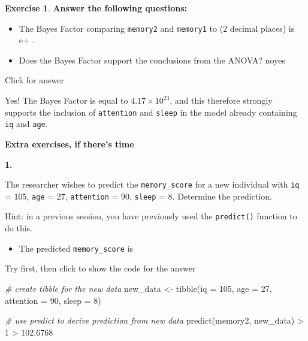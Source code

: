 \documentclass[
]{book}
\newenvironment{Shaded}{\begin{snugshade}}{\end{snugshade}}
\newcommand{\AttributeTok}[1]{\textcolor[rgb]{0.77,0.63,0.00}{#1}}
\newcommand{\CommentTok}[1]{\textcolor[rgb]{0.56,0.35,0.01}{\textit{#1}}}
\newcommand{\DecValTok}[1]{\textcolor[rgb]{0.00,0.00,0.81}{#1}}
\newcommand{\FloatTok}[1]{\textcolor[rgb]{0.00,0.00,0.81}{#1}}
\newcommand{\FunctionTok}[1]{\textcolor[rgb]{0.00,0.00,0.00}{#1}}
\newcommand{\NormalTok}[1]{#1}
\newcommand{\OtherTok}[1]{\textcolor[rgb]{0.56,0.35,0.01}{#1}}
\newcommand{\SpecialCharTok}[1]{\textcolor[rgb]{0.00,0.00,0.00}{#1}}
\providecommand{\tightlist}{%
  \setlength{\itemsep}{0pt}\setlength{\parskip}{0pt}}
\theoremstyle{definition}
\theoremstyle{definition}
\theoremstyle{definition}
\newtheorem{exercise}{Exercise}[chapter]
\theoremstyle{definition}
\theoremstyle{remark}
\begin{document}
\begin{exercise}
\hfill\break

\textbf{Answer the following questions:}

\begin{itemize}
\item
  The Bayes Factor comparing \texttt{memory2} and \texttt{memory1} to (2 decimal places) is e+ .
\item
  Does the Bayes Factor support the conclusions from the ANOVA? noyes
\end{itemize}

Click for answer

Yes! The Bayes Factor is equal to \(4.17 \times 10^{23}\), and this therefore strongly supports the inclusion of \texttt{attention} and \texttt{sleep} in the model already containing \texttt{iq} and \texttt{age}.

\hfill\break

\hfill\break
\textbf{Extra exercises, if there's time}

\textbf{1.}

The researcher wishes to predict the \texttt{memory\_score} for a new individual with \texttt{iq} = 105, \texttt{age} = 27, \texttt{attention} = 90, \texttt{sleep} = 8. Determine the prediction.

\hfill\break
Hint: in a previous session, you have previously used the \texttt{predict()} function to do this.

\hfill\break

\begin{itemize}
\tightlist
\item
  The predicted \texttt{memory\_score} is
\end{itemize}

Try first, then click to show the code for the answer

\begin{Shaded}
\begin{Highlighting}[]
\CommentTok{\# create tibble for the new data}
\NormalTok{new\_data }\OtherTok{\textless{}{-}} \FunctionTok{tibble}\NormalTok{(}\AttributeTok{iq =} \DecValTok{105}\NormalTok{, }\AttributeTok{age =} \DecValTok{27}\NormalTok{, }\AttributeTok{attention =} \DecValTok{90}\NormalTok{, }\AttributeTok{sleep =} \DecValTok{8}\NormalTok{)}

\CommentTok{\# use predict to derive prediction from new data}
\FunctionTok{predict}\NormalTok{(memory2, new\_data)}
\SpecialCharTok{\textgreater{}}        \DecValTok{1} 
\SpecialCharTok{\textgreater{}} \FloatTok{102.6768}
\end{Highlighting}
\end{Shaded}


\end{exercise}
\end{document}
